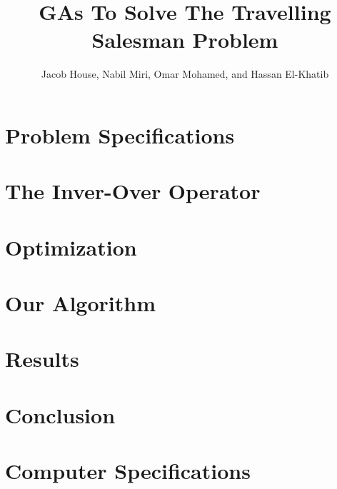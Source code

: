 \documentclass[12pt, twocolumn]{article}
\title{GAs To Solve The Travelling Salesman Problem}
\author{Jacob House, Nabil Miri, Omar Mohamed, and Hassan El-Khatib}
\begin{document}
	\maketitle
	\section{Problem Specifications}
	
	\section{The Inver-Over Operator}
	
	\section{Optimization}
	
	\section{Our Algorithm}
	
	\section{Results}
	
	\section{Conclusion}
	
	\printbibliography
	\appendix
	\section{Computer Specifications}
	\label{sec:comp-specs}
\end{document}
